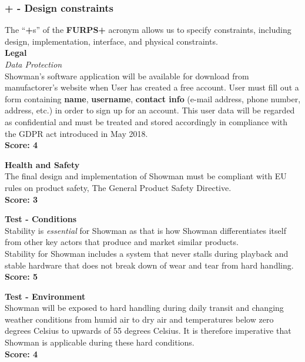 \subsubsection{\textbf{+} - Design constraints}
The “\textbf{+}s” of the \textbf{FURPS+} acronym allows us to specify constraints, including design, implementation, interface, and physical constraints. \\

\textbf{Legal} \\
\textit{Data Protection} \\
Showman's software application will be available for download from manufactorer's website when User has created a free account. User must fill out a form containing \textbf{name}, \textbf{username}, \textbf{contact info} (e-mail address, phone number, address, etc.) in order to sign up for an account. This user data will be regarded as confidential and must be treated and stored accordingly in compliance with the GDPR act introduced in May 2018. \\
\textbf{Score: 4} \newline

\textbf{Health and Safety} \\
The final design and implementation of Showman must be compliant with EU rules on product safety, The General Product Safety Directive. \\
\textbf{Score: 3} \newline

\textbf{Test - Conditions} \\
Stability is \textit{essential} for Showman as that is how Showman differentiates itself from other key actors that produce and market similar products. \\
Stability for Showman includes a system that never stalls during playback and stable hardware that does not break down of wear and tear from hard handling. \\
\textbf{Score: 5} \newline

\textbf{Test - Environment} \\
Showman will be exposed to hard handling during daily transit and changing weather conditions from humid air to dry air and temperatures below zero degrees Celsius to upwards of 55 degrees Celsius. It is therefore imperative that Showman is applicable during these hard conditions. \\
\textbf{Score: 4} \newline

